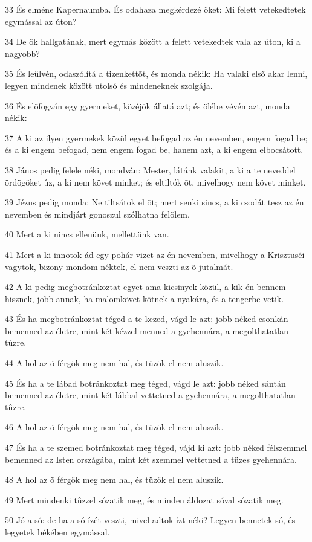 \par 33 És elméne Kapernaumba. És odahaza megkérdezé õket: Mi felett vetekedtetek egymással az úton?
\par 34 De õk hallgatának, mert egymás között a felett vetekedtek vala az úton, ki a nagyobb?
\par 35 És leülvén, odaszólítá a tizenkettõt, és monda nékik: Ha valaki elsõ akar lenni, legyen mindenek között utolsó és mindeneknek szolgája.
\par 36 És elõfogván egy gyermeket, közéjök állatá azt; és ölébe vévén azt, monda nékik:
\par 37 A ki az ilyen gyermekek közül egyet befogad az én nevemben, engem fogad be; és a ki engem befogad, nem engem fogad be, hanem azt, a ki engem elbocsátott.
\par 38 János pedig felele néki, mondván: Mester, látánk valakit, a ki a te neveddel ördögöket ûz, a ki nem követ minket; és eltiltók õt, mivelhogy nem követ minket.
\par 39 Jézus pedig monda: Ne tiltsátok el õt; mert senki sincs, a ki csodát tesz az én nevemben és mindjárt gonoszul szólhatna felõlem.
\par 40 Mert a ki nincs ellenünk, mellettünk van.
\par 41 Mert a ki innotok ád egy pohár vizet az én nevemben, mivelhogy a Krisztuséi vagytok, bizony mondom néktek, el nem veszti az õ jutalmát.
\par 42 A ki pedig megbotránkoztat egyet ama kicsinyek közül, a kik én bennem hisznek, jobb annak, ha malomkövet kötnek a nyakára, és a tengerbe vetik.
\par 43 És ha megbotránkoztat téged a te kezed, vágd le azt: jobb néked csonkán bemenned az életre, mint két kézzel menned a gyehennára, a megolthatatlan tûzre.
\par 44 A hol az õ férgök meg nem hal, és tüzök el nem aluszik.
\par 45 És ha a te lábad botránkoztat meg téged, vágd le azt: jobb néked sántán bemenned az életre, mint két lábbal vettetned a gyehennára, a megolthatatlan tûzre.
\par 46 A hol az õ férgök meg nem hal, és tüzök el nem aluszik.
\par 47 És ha a te szemed botránkoztat meg téged, vájd ki azt: jobb néked félszemmel bemenned az Isten országába, mint két szemmel vettetned a tüzes gyehennára.
\par 48 A hol az õ férgök meg nem hal, és tüzök el nem aluszik.
\par 49 Mert mindenki tûzzel sózatik meg, és minden áldozat sóval sózatik meg.
\par 50 Jó a só: de ha a só ízét veszti, mivel adtok ízt néki? Legyen bennetek só, és legyetek békében egymással.

